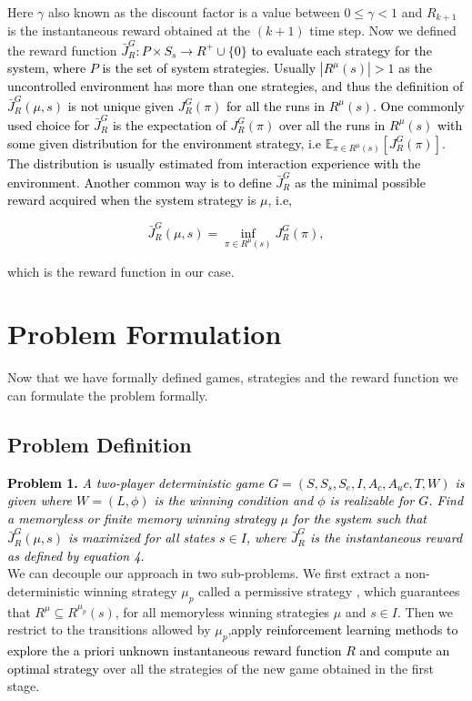 \documentclass[letterpaper, 10 pt, conference]{ieeeconf}  %
\begin{document}
Here $\gamma$ also known as the discount factor is a value  between $0 \leq \gamma < 1$ and $R_{k+1}$ is the instantaneous reward obtained at the $(k + 1)$ time step.  Now we defined the reward function \textcolor{black} {$\bar{J}^{G}_R : P \times S_s \rightarrow R^{+} \cup \{0\}$ to evaluate each strategy for the system, where $P$ is the set of system strategies. Usually $|R^{\mu}(s)| > 1$ as the uncontrolled environment has more than one strategies, and thus the definition of $\bar{J}_R^G(\mu, s)$ is not unique given $J_R^G(\pi)$ for all the runs in $R^{\mu}(s)$. One commonly used choice for $\bar{J}_R^G$ is the expectation of $J_R^G(\pi)$ over all the runs in $R^{\mu}(s)$ with some given distribution for the environment strategy, i.e $\mathbb{E}_{\pi \in R^{\mu}(s)}[J_R^G(\pi)]$. The distribution is usually estimated from interaction experience with the environment. Another common way is to define $\bar{J}_R^G$ as the minimal possible reward acquired when the system strategy is $\mu$, i.e,}

\textcolor{black}{
\begin{equation}
    \bar{J}^G_R(\mu, s) = \inf_{\pi \in R^{\mu}(s)} J_R^G(\pi) ,
\end{equation}
}


which is the reward function in our case.

\section{Problem Formulation}

Now that we have formally defined games, strategies and the reward function we can formulate the problem formally.

\subsection{Problem Definition}

\textcolor{black} {\textbf{Problem 1.}\textit{ A two-player deterministic game $G = (S, S_s, S_e, I, A_c, A_uc, T, W)$ is given where $W = (L, \phi)$ is the winning condition and $\phi$ is realizable for $G$. Find a memoryless or finite memory winning strategy $\mu$ for the system such that $\bar{J}^{G}_R(\mu, s)$ is maximized for all states $s \in I$, where $\bar{J}^{G}_R$ is the instantaneous reward as defined by equation 4.}}\\

We can decouple our approach in two sub-problems. We first extract a non-deterministic winning strategy $\mu_p$ called a permissive strategy\cite{c4} , which guarantees that $R^{\mu} \subseteq R^{\mu_p}(s)$, for all memoryless winning strategies $\mu$ and $s \in I$.  Then we restrict to the transitions allowed by $\mu_p$,\textcolor{black} {apply reinforcement learning methods to explore the a priori unknown instantaneous reward function $R$ and compute an optimal strategy} over all the strategies of the new game obtained in the first stage.
\end{document}
